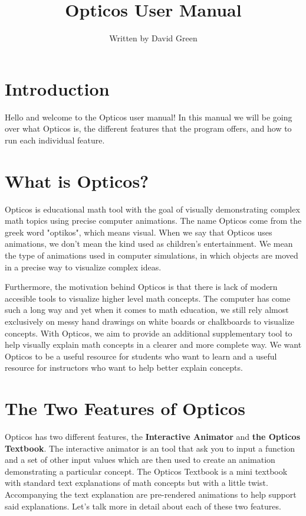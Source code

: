 \documentclass{article}
\title{Opticos User Manual}
\author{Written by David Green}
\date{}
\begin{document}
\maketitle

\section*{Introduction}
Hello and welcome to the Opticos user manual! In this manual we will be going over what Opticos is, the different features that the program offers, and how to run each individual feature.

\section*{What is Opticos?}
Opticos is educational math tool with the goal of visually demonstrating complex math topics using precise computer animations. The name Opticos come from the greek word "optikos", which means visual. When we say that Opticos uses animations, we don't mean the kind used as children's entertainment. We mean the type of animations used in computer simulations, in which objects are moved in a precise way to visualize complex ideas.
\bigskip

Furthermore, the motivation behind Opticos is that there is lack of modern accesible tools to visualize higher level math concepts. The computer has come such a long way and yet when it comes to math education, we still rely almost exclusively on messy hand drawings on white boards or chalkboards to visualize concepts. With Opticos, we aim to provide an additional supplementary tool to help visually explain math concepts in a clearer and more complete way. We want Opticos to be a useful resource for students who want to learn and a useful resource for instructors who want to help better explain concepts.

\section*{The Two Features of Opticos}
Opticos has two different features, the \textbf{Interactive Animator} and \textbf{the Opticos Textbook}. The interactive animator is an tool that ask you to input a function and a set of other input values which are then used to create an animation demonstrating a particular concept. The Opticos Textbook is a mini textbook with standard text explanations of math concepts but with a little twist. Accompanying the text explanation are pre-rendered animations to help support said explanations. Let's talk more in detail about each of these two features.
\pagebreak
\end{document}
